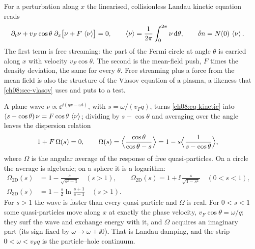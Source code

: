 For a perturbation along $x$ the linearised, collisionless Landau kinetic equation reads
\begin{equation}\label{ch08:eq-kinetic}
\partial_t\nu+v_F\cos\theta\;\partial_x\bigl[\nu+F\,\left\langle \nu\right\rangle\bigr]=0,\qquad \left\langle \nu\right\rangle=\frac1{2\pi}\int_0^{2\pi}\nu\,\mathrm{d}\theta,\qquad \delta n=N(0)\,\left\langle \nu\right\rangle.
\end{equation}
The first term is free streaming: the part of the Fermi circle at angle $\theta$ is carried along $x$ with velocity $v_F\cos\theta$.
The second is the mean-field push, $F$ times the density deviation, the same for every $\theta$.
Free streaming plus a force from the mean field is also the structure of the Vlasov equation of a plasma, a likeness that \cref{ch08:sec-vlasov} uses and puts to a test.

A plane wave $\nu\propto\ee^{\ii(qx-\omega t)}$, with $s=\omega/(v_Fq)$, turns \eqref{ch08:eq-kinetic} into $(s-\cos\theta)\,\nu=F\cos\theta\,\left\langle \nu\right\rangle$; dividing by $s-\cos\theta$ and averaging over the angle leaves the dispersion relation
\begin{equation}\label{ch08:eq-disp}
1+F\,\Omega(s)=0,\qquad \Omega(s)=\Bigl\langle\frac{\cos\theta}{\cos\theta-s}\Bigr\rangle=1-s\Bigl\langle\frac1{s-\cos\theta}\Bigr\rangle ,
\end{equation}
where $\Omega$ is the angular average of the response of free quasi-particles.
On a circle the average is algebraic; on a sphere it is a logarithm:
\begin{align}
\Omega_{2\mathrm D}(s)&=1-\frac{s}{\sqrt{s^2-1}}\quad(s>1),\qquad \Omega_{2\mathrm D}(s)=1+\ii\,\frac{s}{\sqrt{1-s^2}}\quad(0<s<1),\label{ch08:eq-Omega}\\
\Omega_{3\mathrm D}(s)&=1-\frac s2\ln\frac{s+1}{s-1}\quad(s>1).\nonumber
\end{align}
For $s>1$ the wave is faster than every quasi-particle and $\Omega$ is real.
For $0<s<1$ some quasi-particles move along $x$ at exactly the phase velocity, $v_F\cos\theta=\omega/q$; they surf the wave and exchange energy with it, and $\Omega$ acquires an imaginary part (its sign fixed by $\omega\to\omega+\ii0$).
That is Landau damping, and the strip $0<\omega<v_Fq$ is the particle--hole continuum.

